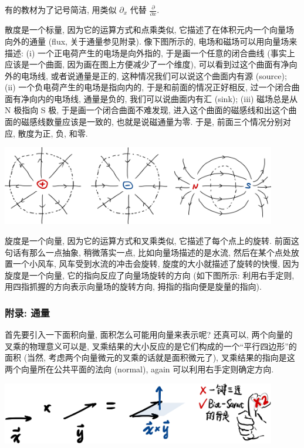 \begin{newquote}
有的教材为了记号简洁, 用类似 \(\partial_x\) 代替
\(\frac{\partial}{\partial x}\).
\end{newquote}

散度是一个标量, 因为它的运算方式和点乘类似,
它描述了在体积元内一个向量场向外的通量 (flux, 关于通量参见附录).
像下图所示的, 电场和磁场可以用向量场来描述: (i)
一个正电荷产生的电场是向外指的, 于是画一个任意的闭合曲线
(事实上应该是一个曲面, 因为画在图上方便减少了一个维度),
可以看到过这个曲面有净向外的电场线, 或者说通量是正的,
这种情况我们可以说这个曲面内有源 (source); (ii)
一个负电荷产生的电场是指向内的, 于是和前面的情况正好相反,
过一个闭合曲面有净向内的电场线, 通量是负的, 我们可以说曲面内有汇 (sink);
(iii) 磁场总是从 N 极指向 S 极, 于是画一个闭合曲面不难发现,
进入这个曲面的磁感线和出这个曲面的磁感线数量应该是一致的,
也就是说磁通量为零. 于是, 前面三个情况分别对应, 散度为正, 负, 和零.

\begin{tcolorbox}[size=fbox, breakable, enhanced jigsaw]
  \includegraphics[width=0.9\textwidth]{img/image-20240125092014626.png}
\end{tcolorbox}

旋度是一个向量, 因为它的运算方式和叉乘类似, 它描述了每个点上的旋转.
前面这句话有那么一点抽象, 稍微落实一点, 比如向量场描述的是水流,
然后在某个点处放置一个小风车, 风车受到水流的冲击会旋转,
旋度的大小就描述了旋转的快慢, 因为旋度是一个向量,
它的指向反应了向量场旋转的方向 (如下图所示: 利用右手定则,
用四指抓握的方向表示向量场的旋转方向, 拇指的指向便是旋量的指向).

\subsubsection{附录: 通量}

首先要引入一下面积向量, 面积怎么可能用向量来表示呢? 还真可以,
两个向量的叉乘的物理意义可以是,
叉乘结果的大小反应的是它们构成的一个``平行四边形''的面积 (当然,
考虑两个向量微元的叉乘的话就是面积微元了),
叉乘结果的指向是这两个向量所在公共平面的法向 (normal), again
可以利用右手定则确定方向.

\begin{tcolorbox}[size=fbox, breakable, enhanced jigsaw]
  \includegraphics[width=0.9\textwidth]{img/image-20240125121748817.png}
\end{tcolorbox}

